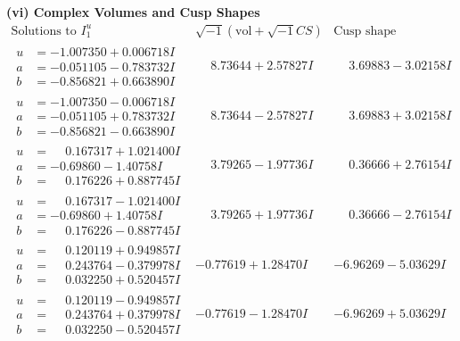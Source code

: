 \documentclass[1p]{elsarticle_modified}
\theoremstyle{definition}
\newcommand{\I}{\sqrt{-1}}
\begin{document}
\newpage\flushleft \textbf{(vi) Complex Volumes and Cusp Shapes}
$$\begin{array}{c|c|c}  
\text{Solutions to }I^u_{1}& \I (\text{vol} + \sqrt{-1}CS) & \text{Cusp shape}\\
 \hline 
\begin{aligned}
u &= -1.007350 + 0.006718 I \\
a &= -0.051105 - 0.783732 I \\
b &= -0.856821 + 0.663890 I\end{aligned}
 & \phantom{-}8.73644 + 2.57827 I & \phantom{-}3.69883 - 3.02158 I \\ \hline\begin{aligned}
u &= -1.007350 - 0.006718 I \\
a &= -0.051105 + 0.783732 I \\
b &= -0.856821 - 0.663890 I\end{aligned}
 & \phantom{-}8.73644 - 2.57827 I & \phantom{-}3.69883 + 3.02158 I \\ \hline\begin{aligned}
u &= \phantom{-}0.167317 + 1.021400 I \\
a &= -0.69860 - 1.40758 I \\
b &= \phantom{-}0.176226 + 0.887745 I\end{aligned}
 & \phantom{-}3.79265 - 1.97736 I & \phantom{-}0.36666 + 2.76154 I \\ \hline\begin{aligned}
u &= \phantom{-}0.167317 - 1.021400 I \\
a &= -0.69860 + 1.40758 I \\
b &= \phantom{-}0.176226 - 0.887745 I\end{aligned}
 & \phantom{-}3.79265 + 1.97736 I & \phantom{-}0.36666 - 2.76154 I \\ \hline\begin{aligned}
u &= \phantom{-}0.120119 + 0.949857 I \\
a &= \phantom{-}0.243764 - 0.379978 I \\
b &= \phantom{-}0.032250 + 0.520457 I\end{aligned}
 & -0.77619 + 1.28470 I & -6.96269 - 5.03629 I \\ \hline\begin{aligned}
u &= \phantom{-}0.120119 - 0.949857 I \\
a &= \phantom{-}0.243764 + 0.379978 I \\
b &= \phantom{-}0.032250 - 0.520457 I\end{aligned}
 & -0.77619 - 1.28470 I & -6.96269 + 5.03629 I \\ \hline\begin{aligned}

\end{aligned}
\end{array}$$
\end{document}
